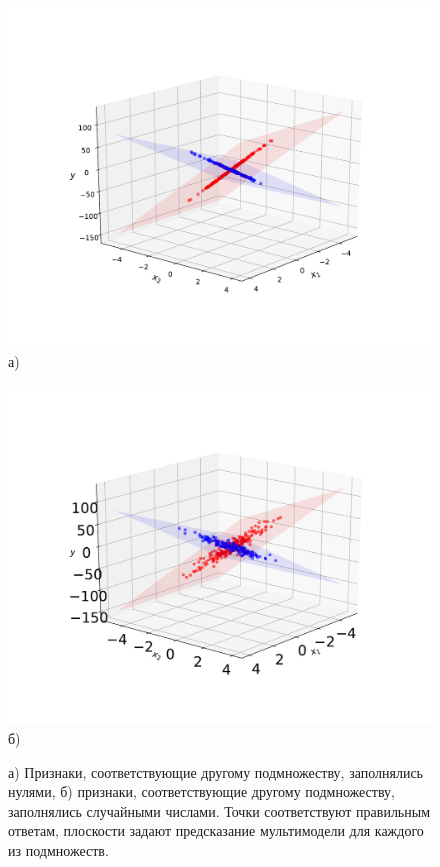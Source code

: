 \documentclass[12pt, twoside]{article}
\begin{document}
\newpage
\begin{figure}[h]
\begin{center}
\begin{minipage}[h]{0.49\linewidth}
\begin{center}\includegraphics[width=1.2\linewidth]{experiment2-zeros.pdf}  а) \end{center}
\end{minipage}
\hfill
\begin{minipage}[h]{0.49\linewidth}
\begin{center}\includegraphics[width=1.2\linewidth]{experiment2-random.pdf}  б) \end{center}
\end{minipage}
\caption{а) Признаки, соответствующие другому подмножеству, заполнялись нулями, б) признаки, соответствующие другому подмножеству, заполнялись случайными числами. Точки соответствуют правильным ответам, плоскости задают предсказание мультимодели для каждого из подмножеств.}
\label{ris:image1}
\end{center}
\end{figure}
\end{document}
